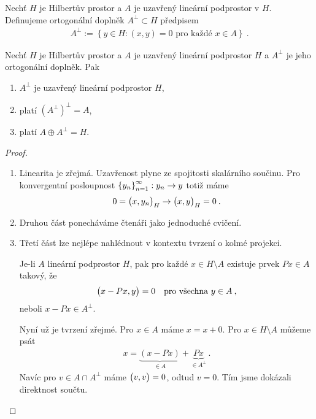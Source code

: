 \begin{definition}
Nechť $H$ je Hilbertův prostor a $A$ je uzavřený lineární podprostor v $H$. Definujeme ortogonální doplněk $A^\bot \subset H$ předpisem \begin{align*}
    A^\bot := \left \lbrace y \in H: (x,y)=0 \text{ pro každé } x \in A  \right \rbrace \:.
\end{align*}
\end{definition}

\begin{theorem}
Nechť $H$ je Hilbertův prostor a $A$ je uzavřený lineární podprostor $H$ a $A^\bot$ je jeho ortogonální doplněk. Pak \begin{enumerate}
    \item $A^\bot$ je uzavřený lineární podprostor $H$,
    \item platí $ (A^\bot)^\bot = A$,
    \item platí $A \oplus A^\bot = H$.
\end{enumerate}
\end{theorem}
\begin{proof}
\begin{enumerate}
    \item Linearita je zřejmá. Uzavřenost plyne ze spojitosti skalárního součinu. Pro konvergentní posloupnost $ \left \lbrace y_n \right \rbrace_{n=1}^\infty : y_n \rightarrow y$ totiž máme \begin{align*}
        0 = \big( x, y_n \big)_H \rightarrow \big( x, y \big)_H = 0 \:.
    \end{align*}
    \item Druhou část ponecháváme čtenáři jako jednoduché cvičení.
    \item Třetí část lze nejlépe nahlédnout v kontextu tvrzení o kolmé projekci.
    
    Je-li $A$ lineární podprostor $H$, pak pro každé $x \in H \setminus A$ existuje prvek $ Px \in A $ takový, že \begin{align*}
        \big( x - Px, y \big) = 0 \quad \text{pro všechna } y \in A \:,
    \end{align*}
    neboli $x-Px \in A^\bot$.
    
    Nyní už je tvrzení zřejmé. Pro $x \in A$ máme $x = x+ 0 $. Pro $x \in H \setminus A$ můžeme psát \begin{align*}
        x = \underbrace{(x -Px)}_{\in A} + \underbrace{Px}_{\in A^\bot} \:.
    \end{align*}
    Navíc pro $ v \in A \cap A^\bot $ máme $\big( v, v \big) = 0$, odtud $v =0$. Tím jsme dokázali direktnost součtu.
\end{enumerate}
\end{proof}

